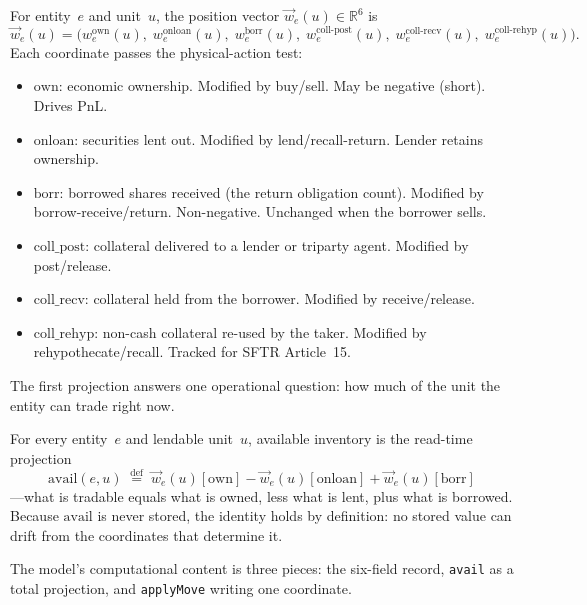 \begin{definition}
\label{def:position-vector-gpm}
For entity~$e$ and unit~$u$, the position vector $\vec{w}_e(u) \in \mathbb{R}^6$ is
\[
\vec{w}_e(u) = \bigl(
  w^{\mathrm{own}}_e(u),\;
  w^{\mathrm{onloan}}_e(u),\;
  w^{\mathrm{borr}}_e(u),\;
  w^{\mathrm{coll\text{-}post}}_e(u),\;
  w^{\mathrm{coll\text{-}recv}}_e(u),\;
  w^{\mathrm{coll\text{-}rehyp}}_e(u)
\bigr).
\]
Each coordinate passes the physical-action test:
\begin{itemize}[nosep]
\item $\mathrm{own}$: economic ownership. Modified by buy/sell. May be negative (short). Drives PnL.
\item $\mathrm{onloan}$: securities lent out. Modified by lend\slash recall-return. Lender retains ownership.
\item $\mathrm{borr}$: borrowed shares received (the return obligation count). Modified by borrow-receive\slash return. Non-negative. Unchanged when the borrower sells.
\item $\mathrm{coll\_post}$: collateral delivered to a lender or triparty agent. Modified by post\slash release.
\item $\mathrm{coll\_recv}$: collateral held from the borrower. Modified by receive\slash release.
\item $\mathrm{coll\_rehyp}$: non-cash collateral re-used by the taker. Modified by rehypothecate/recall. Tracked for SFTR Article~15.
\end{itemize}
\end{definition}

The first projection answers one operational question: how much of the unit the entity can trade right now.

\begin{definition}
\label{def:avail-projection}
For every entity~$e$ and lendable unit~$u$, available inventory is the read-time projection
\[
\mathrm{avail}(e,u) \;\stackrel{\mathrm{def}}{=}\; \vec{w}_e(u)[\mathrm{own}] - \vec{w}_e(u)[\mathrm{onloan}] + \vec{w}_e(u)[\mathrm{borr}]
\]
---what is tradable equals what is owned, less what is lent, plus what is borrowed. Because $\mathrm{avail}$ is never stored, the identity holds by definition: no stored value can drift from the coordinates that determine it.
\end{definition}

The model's computational content is three pieces: the six-field record, \verb|avail| as a total projection, and \verb|applyMove| writing one coordinate.

